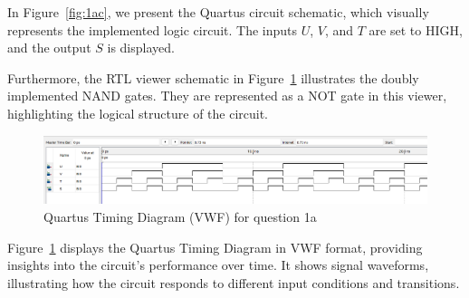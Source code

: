 \documentclass[a4paper,12]{article}
\begin{document}
In Figure~\ref{fig:1ac}, we present the Quartus circuit schematic, which visually represents the implemented logic circuit. The inputs $U$, $V$, and $T$ are set to HIGH, and the output $S$ is displayed.

Furthermore, the RTL viewer schematic in Figure~\ref{fig:1ae} illustrates the doubly implemented NAND gates. They are represented as a NOT gate in this viewer, highlighting the logical structure of the circuit.

\begin{figure}[H]
    \centering
    \includegraphics[width=\textwidth]{q1qtiming.png}
    \caption{Quartus Timing Diagram (VWF) for question 1a}
    \label{fig:1ae}
\end{figure}

Figure~\ref{fig:1ae} displays the Quartus Timing Diagram in VWF format, providing insights into the circuit's performance over time. It shows signal waveforms, illustrating how the circuit responds to different input conditions and transitions.


\newpage
\end{document}
